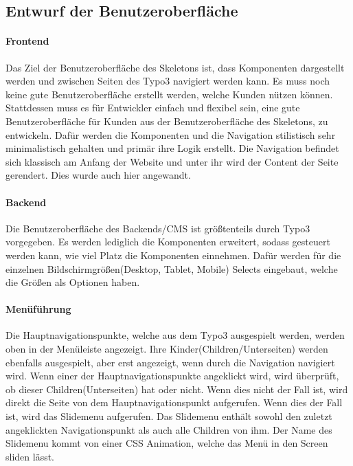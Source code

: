 \subsection{Entwurf der Benutzeroberfläche}
\label{sec:Benutzeroberflaeche} 

\paragraph{Frontend} 
\linebreak
Das Ziel der Benutzeroberfläche des Skeletons ist, dass Komponenten dargestellt werden und zwischen Seiten des Typo3 navigiert werden kann. Es muss noch keine gute Benutzeroberfläche erstellt werden, welche Kunden nützen können. Stattdessen muss es für Entwickler einfach und flexibel sein, eine gute Benutzeroberfläche für Kunden aus der Benutzeroberfläche des Skeletons, zu entwickeln. Dafür werden die Komponenten und die Navigation stilistisch sehr minimalistisch gehalten und primär ihre Logik erstellt. Die Navigation befindet sich klassisch am Anfang der Website und unter ihr wird der Content der Seite gerendert. Dies wurde auch hier angewandt.


\paragraph{Backend} 
\linebreak 
Die Benutzeroberfläche des Backends/CMS ist größtenteils durch Typo3 vorgegeben. Es werden lediglich die Komponenten erweitert, sodass gesteuert werden kann, wie viel Platz die Komponenten einnehmen. Dafür werden für die einzelnen Bildschirmgrößen(Desktop, Tablet, Mobile) Selects eingebaut, welche die Größen als Optionen haben.

\paragraph{Menüführung}  
\linebreak
Die Hauptnavigationspunkte, welche aus dem Typo3 ausgespielt werden, werden oben in der Menüleiste angezeigt. Ihre Kinder(Children/Unterseiten) werden ebenfalls ausgespielt, aber erst angezeigt, wenn durch die Navigation navigiert wird. Wenn einer der Hauptnavigationspunkte angeklickt wird, wird überprüft, ob dieser Children(Unterseiten) hat oder nicht. Wenn dies nicht der Fall ist, wird direkt die Seite von dem Hauptnavigationspunkt aufgerufen. Wenn dies der Fall ist, wird das Slidemenu aufgerufen. Das Slidemenu enthält sowohl den zuletzt angeklickten Navigationspunkt als auch alle Children von ihm. Der Name des Slidemenu kommt von einer CSS Animation, welche das Menü in den Screen sliden lässt. 

